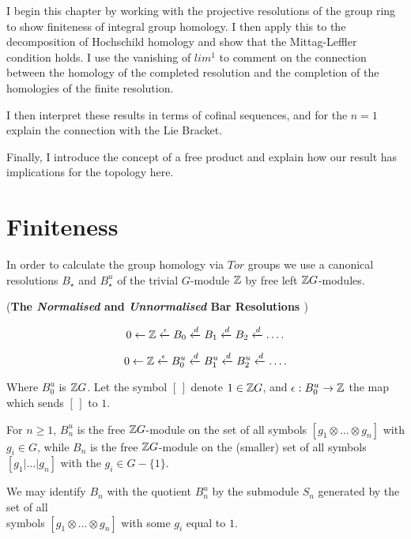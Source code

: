 I begin this chapter by working with the projective resolutions of the group ring to show finiteness of integral group homology. I then apply this to the decomposition of Hochschild homology and show that the Mittag-Leffler condition holds. I use the vanishing of $lim^1$ to comment on the connection between the homology of the completed resolution and the completion of the homologies of the finite resolution.

I then interpret these results in terms of cofinal sequences, and for the $n=1$ explain the connection with the Lie Bracket.

Finally, I introduce the concept of a free product and explain how our result has implications for the topology here.


\section{Finiteness}

In order to calculate the group homology via $Tor$ groups we use a canonical resolutions $B_\star$ and $B_\star^u$ of the trivial $G$-module $\mathbb Z$ by free left $\mathbb Z G$-modules.

\begin{definition} (\textbf{The \textit{Normalised} and \textit{Unnormalised} Bar Resolutions \label{bar}})

$$0\leftarrow \mathbb Z \xleftarrow{\epsilon}B_0\xleftarrow{d} B_1\xleftarrow{d} B_2 \xleftarrow{d} \dots .$$

$$0\leftarrow \mathbb Z \xleftarrow{\epsilon}B_0^u\xleftarrow{d} B_1^u\xleftarrow{d} B_2^u \xleftarrow{d} \dots .$$

Where $B_0^u$ is $\mathbb Z G$. Let the symbol $[\,]$ denote $1 \in \mathbb Z G$, and $\epsilon: B_0^u \rightarrow \mathbb Z$ the map which sends $[\,]$ to $1$.

For $n\geq 1$, $B_n^u$ is the free $\mathbb Z G$-module on the set of all symbols $[ g_1 \otimes \dots \otimes g_n]$ with $g_i \in G$, while $B_n$ is the free $\mathbb Z G$-module on the (smaller) set of all symbols $[ g_1 | \dots | g_n ]$ with the $g_i \in G - \{1 \}$.

\end{definition}

We may identify $B_n$ with the quotient $B_n^u$ by the submodule $S_n$ generated by the set of all \\ symbols $[g_1 \otimes \dots \otimes g_n]$ with some $g_i$ equal to $1$.

